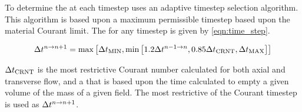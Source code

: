 To determine the \dt{} at each timestep \cobra{} uses an adaptive timestep selection algorithm.
This algorithm is based upon a maximum permissible timestep based upon the material Courant limit.
The \dt{} for any timestep is given by \eqref{eqn:time_step}.

\begin{equation}
\label{eqn:time_step}
\dt{}^{n \rightarrow n+1} = \max\left[ \dt{}_{\text{MIN}}, \min\left[1.2 \dt{}^{n-1 \rightarrow n}, 0.85 \dt{}_{\text{CRNT}}, \dt{}_{\text{MAX}} \right]\right]
\end{equation}

$\dt{}_{\text{CRNT}}$ is the most restrictive Courant number calculated for both axial and transverse flow, and a \dt{} that is based upon the time calculated to empty a given volume of the mass of a given field.
The most restrictive of the Courant timestep is used as $\dt{}^{n \rightarrow n+1}$.